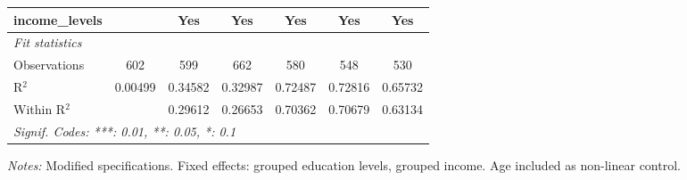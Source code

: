 \begin{tabular}{lcccccc}
   income\_levels                            &          & Yes           & Yes          & Yes      & Yes      & Yes\\  
   \midrule
   \emph{Fit statistics}\\
   Observations                              & 602      & 599           & 662          & 580      & 548      & 530\\  
   R$^2$                                     & 0.00499  & 0.34582       & 0.32987      & 0.72487  & 0.72816  & 0.65732\\  
   Within R$^2$                              &          & 0.29612       & 0.26653      & 0.70362  & 0.70679  & 0.63134\\  
   \midrule \midrule
   \multicolumn{7}{l}{\emph{Signif. Codes: ***: 0.01, **: 0.05, *: 0.1}}\\
\end{tabular}
 
\par \raggedright 
\textit{Notes:} Modified specifications. Fixed effects: grouped education levels, grouped income. Age included as non-linear control.
\par\endgroup



